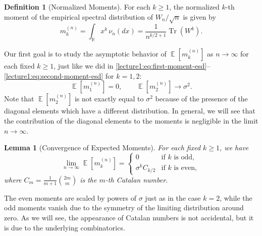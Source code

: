 \documentclass[letterpaper,11pt,oneside,reqno]{book}
\numberwithin{equation}{chapter}  %
\newtheorem{lemma}[proposition]{Lemma}
\theoremstyle{definition}
\newtheorem{definition}[proposition]{Definition}
\begin{document}
\begin{definition}[Normalized Moments]
For each $k\geq 1$, the normalized $k$-th moment of the empirical spectral distribution of $W_n/\sqrt{n}$ is given by
\[
m_k^{(n)}=\int_{\mathbb{R}} x^k\,\nu_n(dx)
=\frac{1}{n^{k/2+1}}\operatorname{Tr}(W^k).
\]
\end{definition}
Our first goal is to study the asymptotic behavior of
$\operatorname{\mathbb{E}}[m_k^{(n)}]$ as $n\to\infty$ for each fixed
$k\geq 1$, just like we did in
\eqref{lecture1:eq:first-moment-esd}--\eqref{lecture1:eq:second-moment-esd}
for $k=1,2$:
\begin{equation*}
	\operatorname{\mathbb{E}}[m_1^{(n)}] = 0, \qquad
	\operatorname{\mathbb{E}}[m_2^{(n)}] \to \sigma^2.
\end{equation*}
Note that $\operatorname{\mathbb{E}}[m_2^{(n)}]$
is not exactly equal to $\sigma^2$ because of the presence of the
diagonal elements which have a different distribution.
In general, we will see that the contribution
of the diagonal elements to the moments is negligible
in the limit $n\to\infty$.

\begin{lemma}[Convergence of Expected Moments]
\label{lecture1:lemma:moments_convergence}
For each fixed $k \geq 1$, we have
\[
\lim_{n \to \infty} \operatorname{\mathbb{E}}[m_k^{(n)}] =
\begin{cases}
0 & \text{if $k$ is odd}, \\
\sigma^k C_{k/2} & \text{if $k$ is even},
\end{cases}
\]
where $C_m = \frac{1}{m+1}\binom{2m}{m}$ is the $m$-th Catalan number.
\end{lemma}

The even moments are scaled by powers of $\sigma$ just as in the case $k=2$,
while the odd moments vanish due to the symmetry of the limiting distribution
around zero.
As we will see, the appearance of Catalan numbers is not accidental,
but it is due to the underlying combinatorics.
\end{document}
